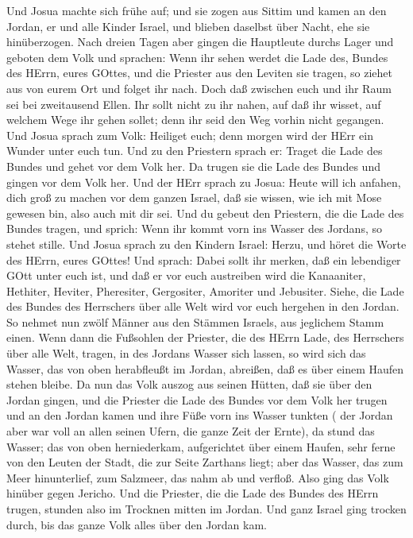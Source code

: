  Und Josua machte sich frühe auf; und sie zogen aus Sittim
und kamen an den Jordan, er und alle Kinder Israel, und blieben daselbst
über Nacht, ehe sie hinüberzogen.  Nach dreien Tagen aber
gingen die Hauptleute durchs Lager  und geboten dem Volk und
sprachen: Wenn ihr sehen werdet die Lade des, Bundes des HErrn, eures
GOttes, und die Priester aus den Leviten sie tragen, so ziehet aus von
eurem Ort und folget ihr nach.  Doch daß zwischen euch und
ihr Raum sei bei zweitausend Ellen. Ihr sollt nicht zu ihr nahen, auf
daß ihr wisset, auf welchem Wege ihr gehen sollet; denn ihr seid den Weg
vorhin nicht gegangen.  Und Josua sprach zum Volk: Heiliget
euch; denn morgen wird der HErr ein Wunder unter euch tun. 
Und zu den Priestern sprach er: Traget die Lade des Bundes und gehet vor
dem Volk her. Da trugen sie die Lade des Bundes und gingen vor dem Volk
her.  Und der HErr sprach zu Josua: Heute will ich anfahen,
dich groß zu machen vor dem ganzen Israel, daß sie wissen, wie ich mit
Mose gewesen bin, also auch mit dir sei.  Und du gebeut den
Priestern, die die Lade des Bundes tragen, und sprich: Wenn ihr kommt
vorn ins Wasser des Jordans, so stehet stille.  Und Josua
sprach zu den Kindern Israel: Herzu, und höret die Worte des HErrn,
eures GOttes!  Und sprach: Dabei sollt ihr merken, daß ein
lebendiger GOtt unter euch ist, und daß er vor euch austreiben wird die
Kanaaniter, Hethiter, Heviter, Pheresiter, Gergositer, Amoriter und
Jebusiter.  Siehe, die Lade des Bundes des Herrschers über
alle Welt wird vor euch hergehen in den Jordan.  So nehmet
nun zwölf Männer aus den Stämmen Israels, aus jeglichem Stamm einen.
 Wenn dann die Fußsohlen der Priester, die des HErrn Lade,
des Herrschers über alle Welt, tragen, in des Jordans Wasser sich
lassen, so wird sich das Wasser, das von oben herabfleußt im Jordan,
abreißen, daß es über einem Haufen stehen bleibe.  Da nun
das Volk auszog aus seinen Hütten, daß sie über den Jordan gingen, und
die Priester die Lade des Bundes vor dem Volk her trugen 
und an den Jordan kamen und ihre Füße vorn ins Wasser tunkten ( der
Jordan aber war voll an allen seinen Ufern, die ganze Zeit der Ernte),
 da stund das Wasser; das von oben herniederkam,
aufgerichtet über einem Haufen, sehr ferne von den Leuten der Stadt, die
zur Seite Zarthans liegt; aber das Wasser, das zum Meer hinunterlief,
zum Salzmeer, das nahm ab und verfloß. Also ging das Volk hinüber gegen
Jericho.  Und die Priester, die die Lade des Bundes des
HErrn trugen, stunden also im Trocknen mitten im Jordan. Und ganz Israel
ging trocken durch, bis das ganze Volk alles über den Jordan kam.

